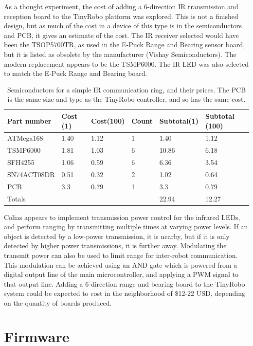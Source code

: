\documentclass[]{article}
\begin{document}
As a thought experiment, the cost of adding a 6-direction IR transmission and reception board  to the TinyRobo platform was explored. 
This is not a finished design, but as much of the cost in a device of this type is in the semiconductors and PCB, it gives an estimate of the cost. 
The IR receiver selected would have been the TSOP5700TR, as used in the E-Puck Range and Bearing sensor board, but it is listed as obsolete by the manufacturer (Vishay Semiconductors). 
The modern replacement appears to be the TSMP6000.
The IR LED was also selected to match the E-Puck Range and Bearing board.

\begin{table}
	\begin{tabular}{l l l l l l}
	Part number & Cost (1) & Cost(100) & Count & Subtotal(1) & Subtotal (100)\\
	\hline 
	ATMega168 & 1.40 & 1.12 & 1 & 1.40 & 1.12  \\
	TSMP6000 & 1.81 & 1.03 & 6 & 10.86 & 6.18  \\
	SFH4255  & 1.06 & 0.59 & 6 & 6.36 & 3.54 \\
	SN74ACT08DR & 0.51 & 0.32 & 2 & 1.02 & 0.64 \\
	PCB & 3.3 & 0.79 & 1 & 3.3 & 0.79\\
	\hline 
	Totals & & & & 22.94 & 12.27\\
	\end{tabular}
	\caption{Semiconductors for a simple IR communication ring, and their prices. The PCB is the same size and type as the TinyRobo controller, and so has the same cost.}
	\label{tab:ir_ranger_board}
\end{table}

Colias appears to implement transmission power control for the infrared LEDs, and perform ranging by transmitting multiple times at varying power levels. 
If an object is detected by a low-power transmission, it is nearby, but if it is only detected by higher power transmissions, it is further away. 
Modulating the transmit power can also be used to limit range for inter-robot communication.
This modulation can be achieved using an AND gate which is powered from a digital output line of the main microcontroller, and applying a PWM signal to that output line.
Adding a 6-direction range and bearing board to the TinyRobo system could be expected to cost in the neighborhood of \$12-22 USD, depending on the quantity of boards produced. 
\section {Firmware}
\end{document}
